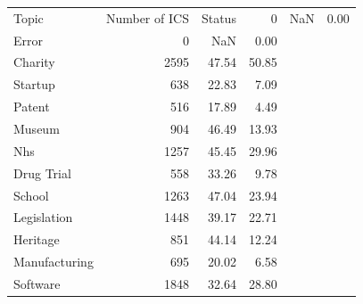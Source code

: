 \begin{tabular}{lrrr}
\toprule
Topic & Number of ICS & %
\midrule
Status & 0 & NaN & 0.00 \\
Error & 0 & NaN & 0.00 \\
Charity & 2595 & 47.54 & 50.85 \\
Startup & 638 & 22.83 & 7.09 \\
Patent & 516 & 17.89 & 4.49 \\
Museum & 904 & 46.49 & 13.93 \\
Nhs & 1257 & 45.45 & 29.96 \\
Drug Trial & 558 & 33.26 & 9.78 \\
School & 1263 & 47.04 & 23.94 \\
Legislation & 1448 & 39.17 & 22.71 \\
Heritage & 851 & 44.14 & 12.24 \\
Manufacturing & 695 & 20.02 & 6.58 \\
Software & 1848 & 32.64 & 28.80 \\
\bottomrule
\end{tabular}
